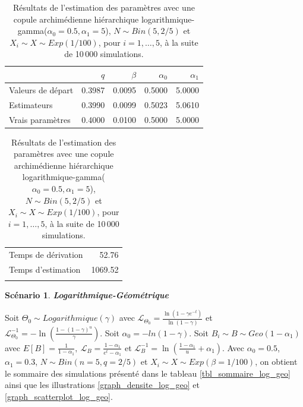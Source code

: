 \documentclass{article}
\newtheorem{Scenario}{Scénario}
\begin{document}
		\begin{table}[H]
			\centering
			\begin{tabular}{lrrrr}
				\hline
				& $q$ & $\beta$ & $\alpha_0$ & $\alpha_1$ \\ 
				\hline
				Valeurs de départ & 0.3987 & 0.0095 & 0.5000 & 5.0000 \\ 
				Estimateurs & 0.3990 & 0.0099 & 0.5023 & 5.0610 \\ 
				Vrais paramètres & 0.4000 & 0.0100 & 0.5000 & 5.0000 \\  
				\hline
			\end{tabular}
			\begin{tabular}{lr}
				\hline
				&  \\ 
				\hline
				Temps de dérivation & 52.76 \\ 
				Temps d'estimation & 1069.52 \\ 
				\\
				\hline
			\end{tabular}
			\caption[Résultats du scénario \ref{scenario_log_gamma}]{Résultats de l'estimation des paramètres avec une copule archimédienne hiérarchique logarithmique-gamma($\alpha_0=0.5, \alpha_1=5$), $N \sim Bin(5, 2/5)$ et $X_i \sim X \sim Exp(1/100)$, pour $i=1,\dots,5$, à la suite de 10\,000 simulations.}
			\label{tbl_resultats_log_gamma}
		\end{table}
	
	
	\begin{Scenario}\label{scenario_log_geo}
		\textbf{Logarithmique-Géométrique}
	\end{Scenario}
	
	Soit $\Theta_0 \sim Logarithmique(\gamma)$ avec $\mathscr{L}_{\Theta_0} = \frac{\ln(1-\gamma e^{-t})}{\ln(1-\gamma)}$ et $\mathscr{L}^{-1}_{\Theta_0} = -\ln \left( \frac{1-(1-\gamma)^u}{\gamma} \right)$. Soit $\alpha_{0} = -ln(1-\gamma)$.
	Soit $B_i \sim B \sim Geo(1-\alpha_1)$ avec $E[B] = \frac{1}{1-\alpha_1},\ \mathscr{L}_{B} = \frac{1-\alpha_1}{e^t-\alpha_1}$ et $\mathscr{L}^{-1}_{B} = \ln\left(\frac{1 - \alpha_1}{u}+\alpha_1\right)$. Avec $\alpha_0 = 0.5$, $\alpha_1 = 0.3$, $N\sim Bin(n=5, q=2/5)$ et $X_i \sim X \sim Exp(\beta = 1/100)$, on obtient le sommaire des simulations présenté dans le tableau \ref{tbl_sommaire_log_geo} ainsi que les illustrations \ref{graph_densite_log_geo} et \ref{graph_scatterplot_log_geo}.
	
\end{document}
